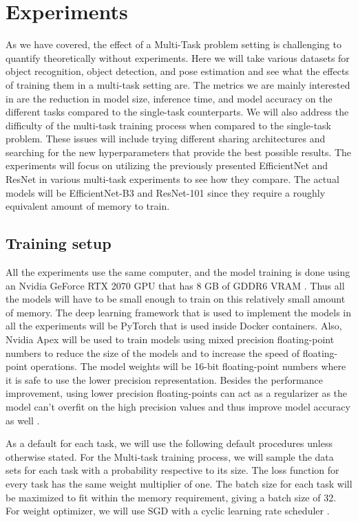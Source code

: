 \chapter{Experiments}
As we have covered, the effect of a Multi-Task problem setting is challenging to quantify theoretically without experiments. 
Here we will take various datasets for object recognition, object detection, and pose estimation and see what the effects of training them in a multi-task setting are. 
The metrics we are mainly interested in are the reduction in model size, inference time, and model accuracy on the different tasks compared to the single-task counterparts.
We will also address the difficulty of the multi-task training process when compared to the single-task problem.
These issues will include trying different sharing architectures and searching for the new hyperparameters that provide the best possible results.
The experiments will focus on utilizing the previously presented EfficientNet and ResNet in various multi-task experiments to see how they compare.
The actual models will be EfficientNet-B3 and ResNet-101 since they require a roughly equivalent amount of memory to train.

\section{Training setup}
All the experiments use the same computer, and the model training is done using an Nvidia GeForce RTX 2070 GPU that has 8 GB of GDDR6 VRAM \citep{nvidiaRTX}. 
Thus all the models will have to be small enough to train on this relatively small amount of memory. 
The deep learning framework that is used to implement the models in all the experiments will be PyTorch \citep{pytorch} that is used inside Docker \citep{docker} containers. 
Also, Nvidia Apex \citep{Apex} will be used to train models using mixed precision floating-point numbers to reduce the size of the models and to increase the speed of floating-point operations. 
The model weights will be 16-bit floating-point numbers where it is safe to use the lower precision representation.
Besides the performance improvement, using lower precision floating-points can act as a regularizer as the model can't overfit on the high precision values and thus improve model accuracy as well \citep{mixedTraining}.

As a default for each task, we will use the following default procedures unless otherwise stated. 
For the Multi-task training process, we will sample the data sets for each task with a probability respective to its size. 
The loss function for every task has the same weight multiplier of one.
The batch size for each task will be maximized to fit within the memory requirement, giving a batch size of 32.
For weight optimizer, we will use SGD with a cyclic learning rate scheduler \citep{cycliclr}.

